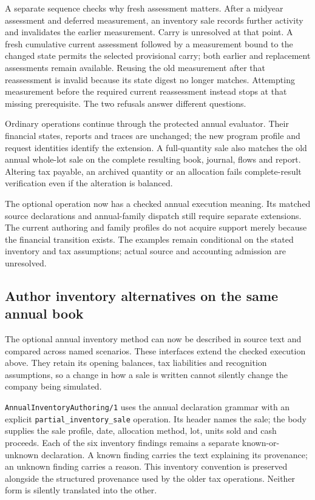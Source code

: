 A separate sequence checks why fresh assessment matters. After a midyear
assessment and deferred measurement, an inventory sale records further
activity and invalidates the earlier measurement. Carry is unresolved at that
point. A fresh cumulative current assessment followed by a measurement bound
to the changed state permits the selected provisional carry; both earlier and
replacement assessments remain available. Reusing the old measurement after
that reassessment is invalid because its state digest no longer matches.
Attempting measurement before the required current reassessment instead stops
at that missing prerequisite. The two refusals answer different questions.

Ordinary operations continue through the protected annual evaluator. Their
financial states, reports and traces are unchanged; the new program profile
and request identities identify the extension. A full-quantity sale also
matches the old annual whole-lot sale on the complete resulting book, journal,
flows and report. Altering tax payable, an archived quantity or an allocation
fails complete-result verification even if the alteration is balanced.

The optional operation now has a checked annual execution meaning. Its matched
source declarations and annual-family dispatch still require separate
extensions. The current authoring and family profiles do not acquire support
merely because the financial transition exists. The examples remain conditional
on the stated inventory and tax assumptions; actual source and accounting
admission are unresolved.


\subsection*{Author inventory alternatives on the same annual book}

The optional annual inventory method can now be described in source text and
compared across named scenarios.  These interfaces extend the checked execution
above.  They retain its opening balances, tax liabilities and recognition
assumptions, so a change in how a sale is written cannot silently change the
company being simulated.

\texttt{Annual\allowbreak{}Inventory\allowbreak{}Authoring/1} uses the annual declaration grammar with an
explicit \texttt{partial\_\allowbreak{}inventory\_\allowbreak{}sale} operation.  Its header names the sale;
the body supplies the sale profile, date, allocation method, lot, units sold and
cash proceeds.  Each of the six inventory findings remains a separate
known-or-unknown declaration.  A known finding carries the text explaining its
provenance; an unknown finding carries a reason.  This inventory convention is
preserved alongside the structured provenance used by the older tax
operations.  Neither form is silently translated into the other.

